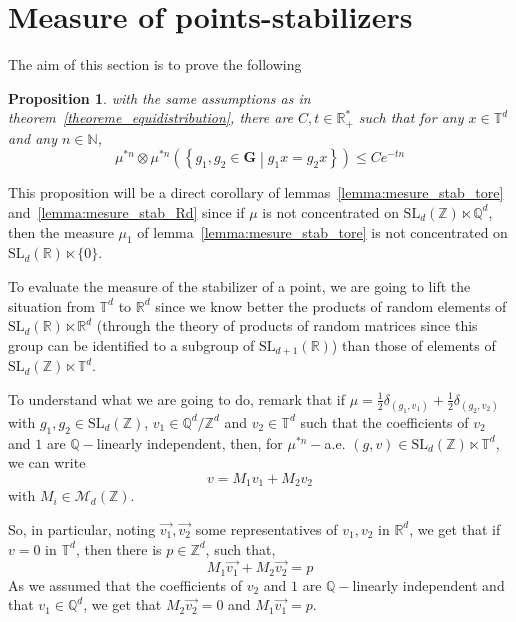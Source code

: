 \documentclass[11pt]{amsart}
\newtheorem{proposition}[theorem]{Proposition}
\theoremstyle{definition}
\theoremstyle{remark}
\numberwithin{equation}{section}
\begin{document}
\section{Measure of points-stabilizers}\label{section_stabilisateurs}

The aim of this section is to prove the following
\begin{proposition}\label{proposition:mesure_stabilisateur}
with the same assumptions as in theorem~\ref{theoreme_equidistribution}, there are $C,t \in {\mathbb R}_+^\ast$ such that for any $x\in {\mathbb T}^d$ and any $n\in {\mathbb N}$,
\[
\mu^{\ast n} \otimes \mu^{\ast n} \left(\left\{g_1,g_2 \in {\mathbf G} \middle| g_1 x = g_2 x\right\}\right) \leqslant Ce^{-tn}
\]
\end{proposition}

This proposition will be a direct corollary of lemmas~\ref{lemma:mesure_stab_tore} and~\ref{lemma:mesure_stab_Rd} since if $\mu$ is not concentrated on $\mathrm{SL}_d({\mathbb Z})\ltimes {\mathbb Q}^d$, then the measure $\mu_1$ of lemma~\ref{lemma:mesure_stab_tore} is not concentrated on $\mathrm{SL}_d({\mathbb R}) \ltimes \{0\}$.

\medskip
To evaluate the measure of the stabilizer of a point, we are going to lift the situation from ${\mathbb T}^d$ to ${\mathbb R}^d$ since we know better the products of random elements of $\mathrm{SL}_d({\mathbb R}) \ltimes {\mathbb R}^d$ (through the theory of products of random matrices since this group can be identified to a subgroup of $\mathrm{SL}_{d+1}({\mathbb R})$) than those of elements of $\mathrm{SL}_d({\mathbb Z}) \ltimes {\mathbb T}^d$.

\medskip
To understand what we are going to do, remark that if $\mu = \frac 1 2 \delta_{(g_1,v_1)} + \frac 1 2 \delta_{(g_2,v_2)}$ with $g_1,g_2\in \mathrm{SL}_d({\mathbb Z})$, $v_1\in {\mathbb Q}^d/{\mathbb Z}^d$ and $v_2\in{\mathbb T}^d$ such that the coefficients of $v_2$ and $1$ are ${\mathbb Q}-$linearly independent, then, for $\mu^{\ast n}-$a.e. $(g,v)\in \mathrm{SL}_d({\mathbb Z})\ltimes {\mathbb T}^d$, we can write
\[
v=M_1 v_1 + M_2 v_2
\]
with $M_i \in \mathcal{M}_d({\mathbb Z})$.

So, in particular, noting $\overrightarrow{v_1}, \overrightarrow{v_2}$ some representatives of $v_1,v_2$ in ${\mathbb R}^d$, we get that if $v=0$ in ${\mathbb T}^d$, then there is $p\in {\mathbb Z}^d$, such that,
\[
M_1 \overrightarrow{v_1} + M_2 \overrightarrow{v_2} = p
\]
As we assumed that the coefficients of $v_2$ and $1$ are ${\mathbb Q}-$linearly independent and that $v_1\in {\mathbb Q}^d$, we get that $M_2 \overrightarrow{v_2} = 0$ and $M_1 \overrightarrow{v_1} = p$.
\end{document}
